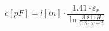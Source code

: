 \documentclass[12pt]{article}
\begin{document}
\begin{displaymath}
c [ pF ] = l [ in ] \cdot \frac{1.41 \cdot \varepsilon_{r}}{\ln \frac{3.81 \cdot H}{0.8 \cdot \omega + t}}
\end{displaymath}
\end{document}
